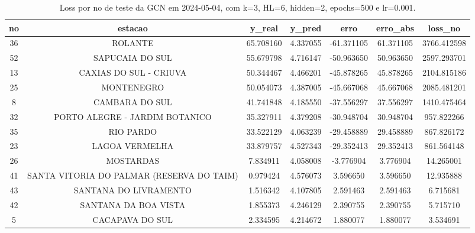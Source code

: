\begin{table}[h]
\centering
\caption{Loss por no de teste da GCN em 2024-05-04, com k=3, HL=6, hidden=2, epochs=500 e lr=0.001.}
\label{tab:gcn_loss_k3_hl6_h2_e500_d20240504}
\begin{tabular}{ccccccc}
\toprule
no & estacao & y\_real & y\_pred & erro & erro\_abs & loss\_no \\
\midrule
36 & ROLANTE & 65.708160 & 4.337055 & -61.371105 & 61.371105 & 3766.412598 \\
52 & SAPUCAIA DO SUL & 55.679798 & 4.716147 & -50.963650 & 50.963650 & 2597.293701 \\
13 & CAXIAS DO SUL - CRIUVA & 50.344467 & 4.466201 & -45.878265 & 45.878265 & 2104.815186 \\
25 & MONTENEGRO & 50.054073 & 4.387005 & -45.667068 & 45.667068 & 2085.481201 \\
8 & CAMBARA DO SUL & 41.741848 & 4.185550 & -37.556297 & 37.556297 & 1410.475464 \\
32 & PORTO ALEGRE - JARDIM BOTANICO & 35.327911 & 4.379208 & -30.948704 & 30.948704 & 957.822266 \\
35 & RIO PARDO & 33.522129 & 4.063239 & -29.458889 & 29.458889 & 867.826172 \\
23 & LAGOA VERMELHA & 33.879757 & 4.527343 & -29.352413 & 29.352413 & 861.564148 \\
26 & MOSTARDAS & 7.834911 & 4.058008 & -3.776904 & 3.776904 & 14.265001 \\
41 & SANTA VITORIA DO PALMAR (RESERVA DO TAIM) & 0.979424 & 4.576073 & 3.596650 & 3.596650 & 12.935888 \\
43 & SANTANA DO LIVRAMENTO & 1.516342 & 4.107805 & 2.591463 & 2.591463 & 6.715681 \\
42 & SANTANA DA BOA VISTA & 1.855373 & 4.246129 & 2.390755 & 2.390755 & 5.715710 \\
5 & CACAPAVA DO SUL & 2.334595 & 4.214672 & 1.880077 & 1.880077 & 3.534691 \\
\bottomrule
\end{tabular}
\end{table}
